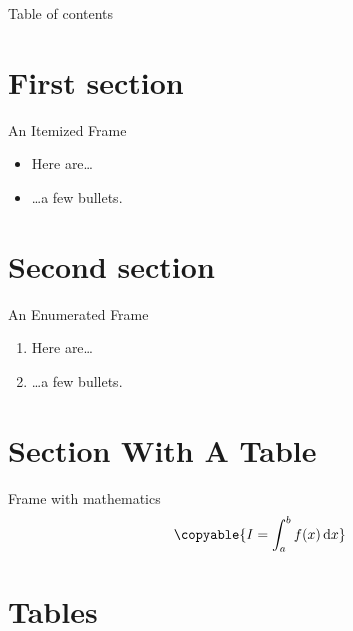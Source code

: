 \documentclass[tikz]{beamer}
\begin{document}
\begin{frame}
\titlepage
\end{frame}

\begin{frame}{Table of contents}
\tableofcontents
\end{frame}

\section{First section}

\begin{frame}{An Itemized Frame}
\begin{itemize}
\item Here are\ldots
\item \ldots a few bullets.
\end{itemize}
\end{frame}

\section{Second section}

\begin{frame}{An Enumerated Frame}
\begin{enumerate}
\item Here are\ldots
\item \ldots a few bullets.
\end{enumerate}
\end{frame}

\section{Section With A Table}

\begin{frame}{Frame with mathematics}
\begin{equation}
  \copyable{
    I = \int_a^b f(x) \,\mathrm d x
  }
\end{equation}
\end{frame}

\section{Tables}
\end{document}
